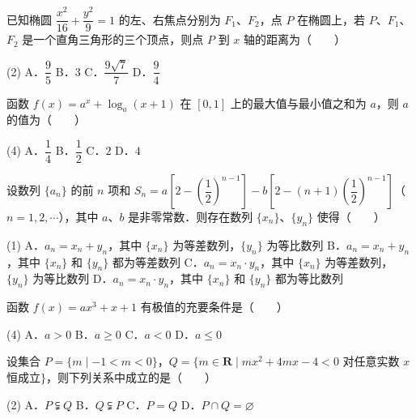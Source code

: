 \begin{question}
已知椭圆 $\dfrac{x^2}{16} + \dfrac{y^2}{9} = 1$ 的左、右焦点分别为 $F_1$、$F_2$，点 $P$ 在椭圆上，若 $P$、$F_1$、$F_2$ 是一个直角三角形的三个顶点，则点 $P$ 到 $x$ 轴的距离为\mbox{（　　）}

\begin{gkopts}(2)
\task A．$\dfrac{9}{5}$
\task B．$3$
\task C．$\dfrac{9\sqrt{7}}{7}$
\task D．$\dfrac{9}{4}$
\end{gkopts}

\end{question}
\begin{question}
函数 $f(x) = a^x + \log_a (x + 1)$ 在 $[0, 1]$ 上的最大值与最小值之和为 $a$，则 $a$ 的值为\mbox{（　　）}

\begin{gkopts}(4)
\task A．$\dfrac{1}{4}$
\task B．$\dfrac{1}{2}$
\task C．$2$
\task D．$4$
\end{gkopts}

\end{question}
\begin{question}
设数列 $\{a_n\}$ 的前 $n$ 项和 $S_n = a\left[2 - \left(\dfrac{1}{2}\right)^{n-1}\right] - b\left[2 - (n + 1)\left(\dfrac{1}{2}\right)^{n-1}\right]$（$n = 1, 2, \cdots$），其中 $a$、$b$ 是非零常数．则存在数列 $\{x_n\}$、$\{y_n\}$ 使得\mbox{（　　）}

\begin{gkopts}(1)
\task A．$a_n = x_n + y_n$，其中 $\{x_n\}$ 为等差数列，$\{y_n\}$ 为等比数列
\task B．$a_n = x_n + y_n$，其中 $\{x_n\}$ 和 $\{y_n\}$ 都为等差数列
\task C．$a_n = x_n \cdot y_n$，其中 $\{x_n\}$ 为等差数列，$\{y_n\}$ 为等比数列
\task D．$a_n = x_n \cdot y_n$，其中 $\{x_n\}$ 和 $\{y_n\}$ 都为等比数列
\end{gkopts}

\end{question}
\begin{question}
函数 $f(x) = ax^3 + x + 1$ 有极值的充要条件是\mbox{（　　）}

\begin{gkopts}(4)
\task A．$a > 0$
\task B．$a \geqslant 0$
\task C．$a < 0$
\task D．$a \leqslant 0$
\end{gkopts}

\end{question}
\begin{question}
设集合 $P = \{m \mid -1 < m < 0\}$，$Q = \{m \in \mathbf{R} \mid mx^2 + 4mx - 4 < 0$ 对任意实数 $x$ 恒成立$\}$，则下列关系中成立的是\mbox{（　　）}

\begin{gkopts}(2)
\task A．$P \subsetneqq Q$
\task B．$Q \subsetneqq P$
\task C．$P = Q$
\task D．$P \cap Q = \varnothing$
\end{gkopts}

\end{question}
